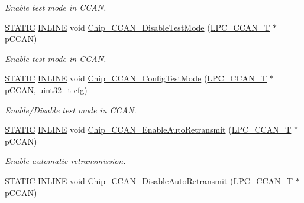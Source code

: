 \begin{DoxyCompactItemize}
\begin{DoxyCompactList}\small\item\em Enable test mode in C\+C\+AN. \end{DoxyCompactList}\item 
\hyperlink{group___l_p_c___types___public___macros_ga10b2d890d871e1489bb02b7e70d9bdfb}{S\+T\+A\+T\+IC} \hyperlink{spifi__18xx__43xx_8h_a2eb6f9e0395b47b8d5e3eeae4fe0c116}{I\+N\+L\+I\+NE} void \hyperlink{group___c_c_a_n__18_x_x__43_x_x_gaa04519b3acfd8302eb601fc9b2927c8d}{Chip\+\_\+\+C\+C\+A\+N\+\_\+\+Disable\+Test\+Mode} (\hyperlink{struct_l_p_c___c_c_a_n___t}{L\+P\+C\+\_\+\+C\+C\+A\+N\+\_\+T} $\ast$p\+C\+C\+AN)
\begin{DoxyCompactList}\small\item\em Enable test mode in C\+C\+AN. \end{DoxyCompactList}\item 
\hyperlink{group___l_p_c___types___public___macros_ga10b2d890d871e1489bb02b7e70d9bdfb}{S\+T\+A\+T\+IC} \hyperlink{spifi__18xx__43xx_8h_a2eb6f9e0395b47b8d5e3eeae4fe0c116}{I\+N\+L\+I\+NE} void \hyperlink{group___c_c_a_n__18_x_x__43_x_x_ga6348cfc02990a10658e6b3b800c2d702}{Chip\+\_\+\+C\+C\+A\+N\+\_\+\+Config\+Test\+Mode} (\hyperlink{struct_l_p_c___c_c_a_n___t}{L\+P\+C\+\_\+\+C\+C\+A\+N\+\_\+T} $\ast$p\+C\+C\+AN, uint32\+\_\+t cfg)
\begin{DoxyCompactList}\small\item\em Enable/\+Disable test mode in C\+C\+AN. \end{DoxyCompactList}\item 
\hyperlink{group___l_p_c___types___public___macros_ga10b2d890d871e1489bb02b7e70d9bdfb}{S\+T\+A\+T\+IC} \hyperlink{spifi__18xx__43xx_8h_a2eb6f9e0395b47b8d5e3eeae4fe0c116}{I\+N\+L\+I\+NE} void \hyperlink{group___c_c_a_n__18_x_x__43_x_x_gadbb66ec94ce472bee4289fa891c86417}{Chip\+\_\+\+C\+C\+A\+N\+\_\+\+Enable\+Auto\+Retransmit} (\hyperlink{struct_l_p_c___c_c_a_n___t}{L\+P\+C\+\_\+\+C\+C\+A\+N\+\_\+T} $\ast$p\+C\+C\+AN)
\begin{DoxyCompactList}\small\item\em Enable automatic retransmission. \end{DoxyCompactList}\item 
\hyperlink{group___l_p_c___types___public___macros_ga10b2d890d871e1489bb02b7e70d9bdfb}{S\+T\+A\+T\+IC} \hyperlink{spifi__18xx__43xx_8h_a2eb6f9e0395b47b8d5e3eeae4fe0c116}{I\+N\+L\+I\+NE} void \hyperlink{group___c_c_a_n__18_x_x__43_x_x_gab97933336f93abffde9ad630c0ad487d}{Chip\+\_\+\+C\+C\+A\+N\+\_\+\+Disable\+Auto\+Retransmit} (\hyperlink{struct_l_p_c___c_c_a_n___t}{L\+P\+C\+\_\+\+C\+C\+A\+N\+\_\+T} $\ast$p\+C\+C\+AN)

\end{DoxyCompactItemize}
